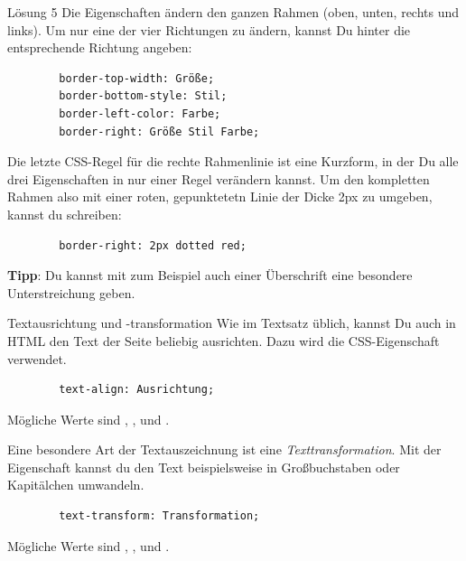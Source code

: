 \documentclass[lerntheke,12pt,a5paper,landscape]{arbeitsblatt}
\begin{document}
\begin{loesungskarte}{Lösung 5}
	Die Eigenschaften ändern den ganzen Rahmen (oben, unten, rechts und links). Um nur eine der vier Richtungen zu ändern, kannst Du hinter  die entsprechende Richtung angeben:

	\begin{verbatim}
		border-top-width: Größe;
		border-bottom-style: Stil;
		border-left-color: Farbe;
		border-right: Größe Stil Farbe;
	\end{verbatim}

	Die letzte CSS-Regel für die rechte Rahmenlinie ist eine Kurzform, in der Du alle drei Eigenschaften in nur einer Regel verändern kannst. Um den kompletten Rahmen also mit einer roten, gepunktetetn Linie der Dicke 2px zu umgeben, kannst du schreiben:

	\begin{verbatim}
		border-right: 2px dotted red;
	\end{verbatim}

	{\small\textbf{Tipp}: Du kannst mit  zum Beispiel auch einer Überschrift eine besondere Unterstreichung geben.}
\end{loesungskarte}

\begin{karte2}{Textausrichtung und -transformation}
	Wie im Textsatz üblich, kannst Du auch in HTML den Text der Seite beliebig ausrichten. Dazu wird die CSS-Eigenschaft  verwendet.

	\begin{verbatim}
		text-align: Ausrichtung;
	\end{verbatim}

	Mögliche Werte sind , ,  und .

	Eine besondere Art der Textauszeichnung ist eine \emph{Texttransformation}. Mit der Eigenschaft  kannst du den Text beispielsweise in Großbuchstaben oder Kapitälchen umwandeln.

	\begin{verbatim}
		text-transform: Transformation;
	\end{verbatim}

	Mögliche Werte sind , ,  und .
\end{karte2}
\end{document}
